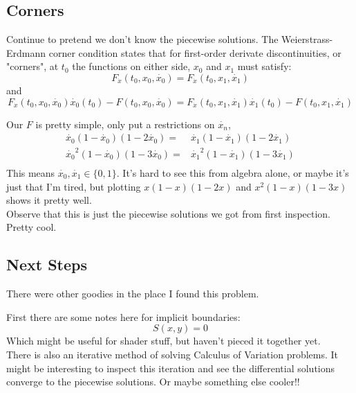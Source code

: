 \subsection{Corners} 
Continue to pretend we don't know the piecewise solutions.
The Weierstrass-Erdmann corner condition states that for first-order derivate discontinuities,
or "corners", 
at $t_0$ the functions on either side,
$x_0$ and $x_1$ must satisfy:
\[F_{\dot{x}}(t_0,x_0,\dot{x_0}) = F_{\dot{x}}(t_0,x_1,\dot{x_1})\]
and
\[F_{\dot{x}}(t_0,x_0,\dot{x_0})\dot{x_0}(t_0)-F(t_0,x_0,\dot{x_0}) = F_{\dot{x}}(t_0,x_1,\dot{x_1})\dot{x_1}(t_0)-F(t_0,x_1,\dot{x_1})\]

Our $F$ is pretty simple, 
only put a restrictions on $\dot{x_n}$, 
\begin{equation*}
\begin{aligned}
	\dot{x_0}(1-\dot{x_0})(1-2\dot{x_0}) =& \dot{x_1}(1-\dot{x_1})(1-2\dot{x_1}) \\
	\dot{x_0}^2(1-\dot{x_0})(1-3\dot{x_0}) =& \dot{x_1}^2(1-\dot{x_1})(1-3\dot{x_1}) \\
\end{aligned}
\end{equation*}
This means $\dot{x_0},\dot{x_1}\in\{0,1\}$.
It's hard to see this from algebra alone,
or maybe it's just that I'm tired,
but plotting $x(1-x)(1-2x)$ and $x^2(1-x)(1-3x)$ shows it pretty well.
\\

Observe that this is just the piecewise solutions we got from first inspection.
Pretty cool.

\subsection{Next Steps}
There were other goodies in the place I found this problem.

First there are some notes here for implicit boundaries:
\[S(x,y)=0\]
Which might be useful for shader stuff,
but haven't pieced it together yet.
\\

There is also an iterative method of solving Calculus of Variation problems.
It might be interesting to inspect this iteration and see the differential solutions converge to the piecewise solutions.
Or maybe something else cooler!!
